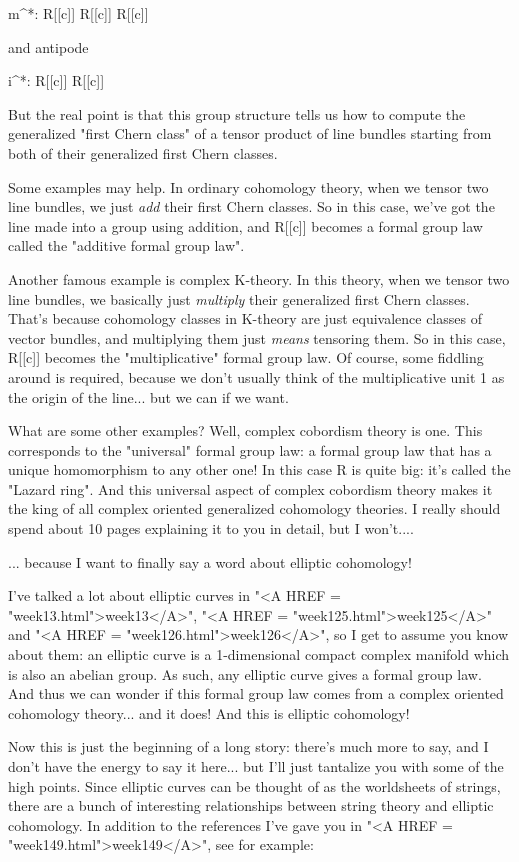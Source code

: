 m^{*}: R[[c]] \to  R[[c]] \otimes  R[[c]]

and antipode

i^{*}: R[[c]] \to  R[[c]]

But the real point is that this group structure tells us how to compute 
the generalized "first Chern class" of a tensor product of line bundles
starting from both of their generalized first Chern classes.  

Some examples may help.  In ordinary cohomology theory, when we tensor
two line bundles, we just \emph{add} their first Chern classes.  So
in this case, we've got the line made into a group using addition, and
R[[c]] becomes a formal group law called the "additive formal
group law".

Another famous example is complex K-theory.  In this theory, when we
tensor two line bundles, we basically just \emph{multiply} their
generalized first Chern classes.  That's because cohomology classes in
K-theory are just equivalence classes of vector bundles, and
multiplying them just \emph{means} tensoring them.  So in this case,
R[[c]] becomes the "multiplicative" formal group law.  Of
course, some fiddling around is required, because we don't usually
think of the multiplicative unit 1 as the origin of the line... but we
can if we want.

What are some other examples?  Well, complex cobordism theory is one.
This corresponds to the "universal" formal group law: a
formal group law that has a unique homomorphism to any other one!  In
this case R is quite big: it's called the "Lazard ring".
And this universal aspect of complex cobordism theory makes it the
king of all complex oriented generalized cohomology theories.  I
really should spend about 10 pages explaining it to you in detail, but
I won't....

... because I want to finally say a word about elliptic cohomology!

I've talked a lot about elliptic curves in "<A HREF =
"week13.html">week13</A>", "<A HREF =
"week125.html">week125</A>" and "<A HREF =
"week126.html">week126</A>", so I get to assume you know about
them: an elliptic curve is a 1-dimensional compact complex manifold
which is also an abelian group.  As such, any elliptic curve gives a
formal group law.  And thus we can wonder if this formal group law
comes from a complex oriented cohomology theory... and it does!  And
this is elliptic cohomology!

Now this is just the beginning of a long story: there's much more to 
say, and I don't have the energy to say it here... but I'll just
tantalize you with some of the high points.  Since elliptic curves
can be thought of as the worldsheets of strings, there are a bunch
of interesting relationships between string theory and elliptic 
cohomology.  In addition to the references I've gave you in 
"<A HREF = "week149.html">week149</A>",
see for example:

